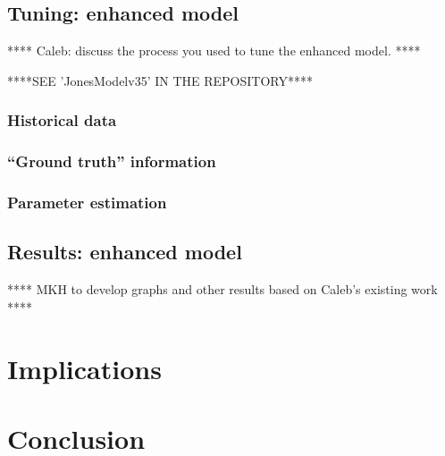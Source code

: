 \documentclass[letterpaper,12pt]{article}
\begin{document}
\subsection{Tuning: enhanced model}
\label{sec:enhanced_model_tuning}

**** Caleb: discuss the process you used to tune the enhanced model. ****

****SEE 'JonesModelv35' IN THE REPOSITORY****

\subsubsection{Historical data}
\label{sec:enhanced_model_historical_data}

\subsubsection{``Ground truth'' information}
\label{sec:enhanced_model_ground_truth}

\subsubsection{Parameter estimation}
\label{sec:enhanced_model_parameter_estimation}


\subsection{Results: enhanced model}
\label{sec:enhanced_model_results}

**** MKH to develop graphs and other results based on Caleb's existing work ****


\section{Implications}
\label{sec:Implications}


\section{Conclusion}
\label{sec:Conclustion}
\end{document}
